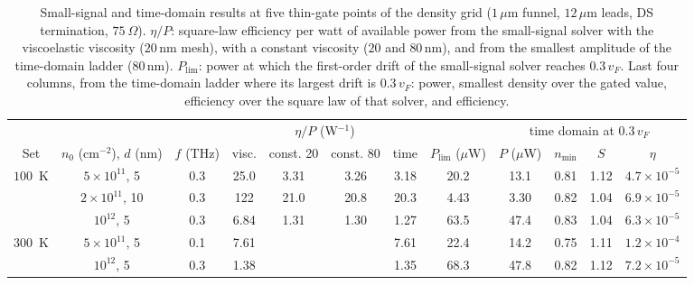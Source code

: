 \documentclass[aps,prapplied,onecolumn,superscriptaddress,floatfix]{revtex4-2}
\newcommand{\um}{\,\mu\mathrm{m}}
\newcommand{\nm}{\,\mathrm{nm}}
\begin{document}
\begin{table}[ht]
\caption{\label{tab:laddersfull}Small-signal and time-domain results at
five thin-gate points of the density grid ($1\um$ funnel, $12\um$ leads,
DS termination, $75\ \Omega$). $\eta/P$: square-law efficiency per watt
of available power from the small-signal solver with the viscoelastic
viscosity ($20\nm$ mesh), with a constant viscosity ($20$ and $80\nm$),
and from the smallest amplitude of the time-domain ladder ($80\nm$).
$P_{\mathrm{lim}}$: power at which the first-order drift of the
small-signal solver reaches $0.3\,v_{F}$. Last four columns, from the
time-domain ladder where its largest drift is $0.3\,v_{F}$: power,
smallest density over the gated value, efficiency over the square law of
that solver, and efficiency.}
\begin{ruledtabular}
\begin{tabular}{cccccccccccc}
 & & & \multicolumn{4}{c}{$\eta/P$ (W$^{-1}$)} & & \multicolumn{4}{c}{time domain at $0.3\,v_{F}$} \\
Set & $n_{0}$ (cm$^{-2}$), $d$ (nm) & $f$ (THz) & visc. & const. 20 & const. 80 & time & $P_{\mathrm{lim}}$ ($\mu$W) & $P$ ($\mu$W) & $n_{\min}$ & $S$ & $\eta$ \\
\hline
$100$~K & $5\times10^{11}$, 5 & 0.3 & 25.0 & 3.31 & 3.26 & 3.18 & 20.2 & 13.1 & 0.81 & 1.12 & $4.7\times10^{-5}$ \\
 & $2\times10^{11}$, 10 & 0.3 & 122 & 21.0 & 20.8 & 20.3 & 4.43 & 3.30 & 0.82 & 1.04 & $6.9\times10^{-5}$ \\
 & $10^{12}$, 5 & 0.3 & 6.84 & 1.31 & 1.30 & 1.27 & 63.5 & 47.4 & 0.83 & 1.04 & $6.3\times10^{-5}$ \\
$300$~K & $5\times10^{11}$, 5 & 0.1 & 7.61 & & & 7.61 & 22.4 & 14.2 & 0.75 & 1.11 & $1.2\times10^{-4}$ \\
 & $10^{12}$, 5 & 0.3 & 1.38 & & & 1.35 & 68.3 & 47.8 & 0.82 & 1.12 & $7.2\times10^{-5}$ \\
\end{tabular}
\end{ruledtabular}
\end{table}
\end{document}

